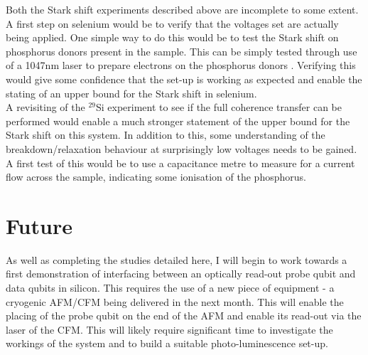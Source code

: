 Both the Stark shift experiments described above are incomplete to some extent. 
A first step on selenium would be to verify that the voltages set are actually being applied.
One simple way to do this would be to test the Stark shift on phosphorus donors present in the sample.
This can be simply tested through use of a 1047nm laser to prepare electrons on the phosphorus donors \cite{Nardo2015}.
Verifying this would give some confidence that the set-up is working as expected and enable the stating of an upper bound for the Stark shift in selenium.
\\
A revisiting of the $^{29}$Si experiment to see if the full coherence transfer can be performed would enable a much stronger statement of the upper bound for the Stark shift on this system.
In addition to this, some understanding of the breakdown/relaxation behaviour at surprisingly low voltages needs to be gained.
A first test of this would be to use a capacitance metre to measure for a current flow across the sample, indicating some ionisation of the phosphorus. 

\section{Future}

As well as completing the studies detailed here, I will begin to work towards a first demonstration of interfacing between an optically read-out probe qubit and data qubits in silicon.
This requires the use of a new piece of equipment - a cryogenic AFM/CFM being delivered in the next month.
This will enable the placing of the probe qubit on the end of the AFM and enable its read-out via the laser of the CFM.
This will likely require significant time to investigate the workings of the system and to build a suitable photo-luminescence set-up.
